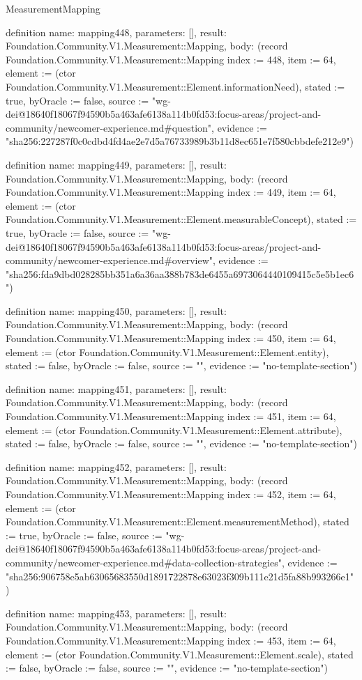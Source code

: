 \begin{lexlean}{MeasurementMapping}
\begin{semanticmodule}
definition{
  name: mapping448,
  parameters: [],
  result: Foundation.Community.V1.Measurement::Mapping,
  body: (record Foundation.Community.V1.Measurement::Mapping {index := 448, item := 64, element := (ctor Foundation.Community.V1.Measurement::Element.informationNeed), stated := true, byOracle := false, source := "wg-dei@18640f18067f94590b5a463afe6138a114b0fd53:focus-areas/project-and-community/newcomer-experience.md#question", evidence := "sha256:227287f0c0cdbd4fd4ae2e7d5a76733989b3b11d8ec651e7f580cbbdefe212e9"})
}

definition{
  name: mapping449,
  parameters: [],
  result: Foundation.Community.V1.Measurement::Mapping,
  body: (record Foundation.Community.V1.Measurement::Mapping {index := 449, item := 64, element := (ctor Foundation.Community.V1.Measurement::Element.measurableConcept), stated := true, byOracle := false, source := "wg-dei@18640f18067f94590b5a463afe6138a114b0fd53:focus-areas/project-and-community/newcomer-experience.md#overview", evidence := "sha256:fda9dbd028285bb351a6a36aa388b783de6455a6973064440109415c5e5b1ec6"})
}

definition{
  name: mapping450,
  parameters: [],
  result: Foundation.Community.V1.Measurement::Mapping,
  body: (record Foundation.Community.V1.Measurement::Mapping {index := 450, item := 64, element := (ctor Foundation.Community.V1.Measurement::Element.entity), stated := false, byOracle := false, source := "", evidence := "no-template-section"})
}

definition{
  name: mapping451,
  parameters: [],
  result: Foundation.Community.V1.Measurement::Mapping,
  body: (record Foundation.Community.V1.Measurement::Mapping {index := 451, item := 64, element := (ctor Foundation.Community.V1.Measurement::Element.attribute), stated := false, byOracle := false, source := "", evidence := "no-template-section"})
}

definition{
  name: mapping452,
  parameters: [],
  result: Foundation.Community.V1.Measurement::Mapping,
  body: (record Foundation.Community.V1.Measurement::Mapping {index := 452, item := 64, element := (ctor Foundation.Community.V1.Measurement::Element.measurementMethod), stated := true, byOracle := false, source := "wg-dei@18640f18067f94590b5a463afe6138a114b0fd53:focus-areas/project-and-community/newcomer-experience.md#data-collection-strategies", evidence := "sha256:906758e5ab63065683550d1891722878e63023f309b111e21d5fa88b993266e1"})
}

definition{
  name: mapping453,
  parameters: [],
  result: Foundation.Community.V1.Measurement::Mapping,
  body: (record Foundation.Community.V1.Measurement::Mapping {index := 453, item := 64, element := (ctor Foundation.Community.V1.Measurement::Element.scale), stated := false, byOracle := false, source := "", evidence := "no-template-section"})
}


\end{semanticmodule}
\end{lexlean}
